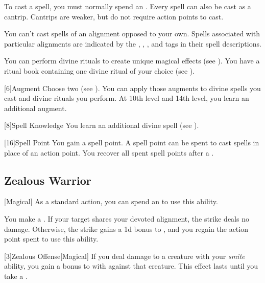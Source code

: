         To cast a spell, you must normally spend an .
        Every spell can also be cast as a cantrip.
        Cantrips are weaker, but do not require action points to cast.

        You can't cast spells of an alignment opposed to your own.
        Spells associated with particular alignments are indicated by the , , , and  tags in their spell descriptions.

        You can perform divine rituals to create unique magical effects (see ).
        You have a ritual book containing one divine ritual of your choice (see ).

        [6]{Augment}
        Choose two  (see ).
        You can apply those augments to divine spells you cast and divine rituals you perform.
        At 10th level and 14th level, you learn an additional augment.

        [8]{Spell Knowledge}
        You learn an additional divine spell (see ).

        [16]{Spell Point} 
        You gain a spell point.
        A spell point can be spent to cast spells in place of an action point.
        You recover all spent spell points after a .

    \subsection{Zealous Warrior}
        [Magical] As a standard action, you can spend an  to use this ability.
        \begin{ability}
            \begin{spelleffects}
                \spelleffect You make a .
                If your target shares your devoted alignment, the strike deals no damage.
                Otherwise, the strike gains a \plus1d bonus to , and you regain the action point spent to use this ability.
            \end{spelleffects}
        \end{ability}

        [3]{Zealous Offense}[Magical]
        If you deal damage to a creature with your \textit{smite} ability, you gain a  bonus to  with  against that creature.
        This effect lasts until you take a .

